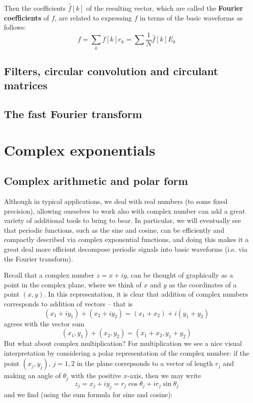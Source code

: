 \documentclass[12pt]{report}
\theoremstyle{plain}
\begin{document}
Then the coefficients $\hat f[k]$ of the resulting vector, which are called the \textbf{Fourier coefficients} of $f$, are related to expressing $f$ in terms of the basic waveforms as follows:
\[f = \sum_k f[k] e_k = \sum \frac 1 N \hat f[k] E_k \]
\section{Filters, circular convolution and circulant matrices}

\section{The fast Fourier transform}

\appendix

\chapter{Complex exponentials}

\section{Complex arithmetic and polar form}

Although in typical applications, we deal with real numbers (to some fixed precision), allowing ourselves to work also with complex number can add a great variety of additional tools to bring to bear. In particular, we will eventually see that periodic functions, such as the sine and cosine, can be efficiently and compactly described via complex exponential functions, and doing this makes it a great deal more efficient decompose periodic signals into basic waveforms (i.e. via the Fourier transform).

Recall that a complex number $z = x + iy$, can be thought of graphically as a point in the complex plane, where we think of $x$ and $y$ as the coordinates of a point $(x, y)$. In this representation, it is clear that addition of complex numbers corresponds to addition of vectors -- that is
\[ (x_1 + i y_1) + (x_2 + i y_2) = (x_1 + x_2) + i (y_1 + y_2)\]
agrees with the vector sum
\[ (x_1, y_1) + (x_2, y_2) = (x_1 + x_2, y_1 + y_2) \]
But what about complex multiplication? For multiplication we see a nice visual interpretation by considering a polar representation of the complex number: if the point $(x_j, y_j)$, $j = 1, 2$ in the plane correpsonds to a vector of length $r_j$ and making an angle of $\theta_j$ with the positive $x$-axis, then we may write
\[z_j = x_j + i y_j = r_j \cos \theta_j + i r_j \sin \theta_j \]
and we find (using the sum formula for sine and cosine):
\end{document}
